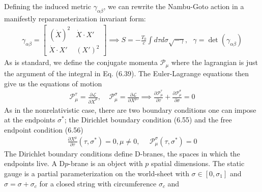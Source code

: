 \documentclass[11pt]{article}
\newcommand{\lagrangian}{\mathcal{L}}
\begin{document}
Defining the induced metric $\gamma_{\alpha \beta}$, we can rewrite the Nambu-Goto action in a manifestly reparameterization invariant form: 
\begin{align*}
    \gamma_{\alpha\beta} = \begin{bmatrix}
        (\dot{X})^2 & \dot{X} \cdot X' \\
        \dot{X}\cdot X' & (X')^2 
    \end{bmatrix} \implies 
    S = -\frac{T_0}{c} \int d\tau d\sigma \sqrt{-\gamma}, ~~~ \gamma = \det(\gamma_{\alpha\beta}) \tag{6.43, 6.44}
\end{align*} 
As is standard, we define the conjugate momenta $\mathcal{P}_\mu$ where the lagrangian is just the argument of the integral in Eq. (6.39). The Euler-Lagrange equations then give us the equations of motion
\begin{align*}
    \mathcal{P}^\tau_\mu = \frac{\partial \lagrangian}{\partial \dot{X}^\mu}, ~~~~~\mathcal{P}^\sigma_\mu = \frac{\partial \lagrangian}{\partial {X^\mu}'} \implies \frac{\partial \mathcal{P}^\tau_\mu}{\partial \tau} + \frac{\partial \mathcal{P}^\sigma_\mu}{\partial \sigma} = 0 \tag{6.49, 6.50, 6.53}
\end{align*}
As in the nonrelativistic case, there are two boundary conditions one can impose at the endpoints $\sigma^*$; the Dirichlet boundary condition (6.55) and the free endpoint condition (6.56)
\begin{align*}
    \frac{\partial X^\mu }{\partial \tau} (\tau, \sigma^*) = 0, \mu \neq 0, ~~~~~~ \mathcal{P}^\sigma_\mu(\tau, \sigma^*)= 0 \tag{6.55, 6.56}
\end{align*}
The Dirichlet boundary conditions define D-branes, the spaces in which the endpoints live. A D$p$-brane is an object with $p$ spatial dimensions. The static gauge is a partial parameterization on the world-sheet with $\sigma \in [0,\sigma_1]$ and $\sigma = \sigma + \sigma_c$ for a closed string with circumference $\sigma_c$ and
\end{document}
